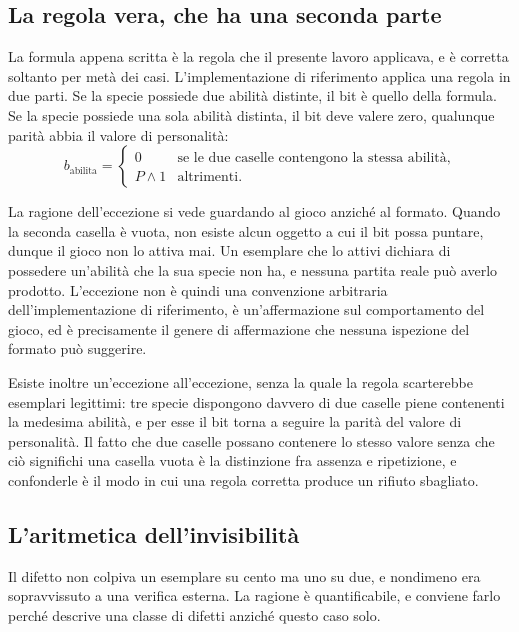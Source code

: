\subsection*{La regola vera, che ha una seconda parte}

La formula appena scritta è la regola che il presente lavoro applicava, e è corretta soltanto per metà dei casi. L'implementazione di riferimento applica una regola in due parti. Se la specie possiede due abilità distinte, il bit è quello della formula. Se la specie possiede una sola abilità distinta, il bit deve valere zero, qualunque parità abbia il valore di personalità:
\begin{equation}
b_{\mathrm{abilita}} =
\begin{cases}
0 & \text{se le due caselle contengono la stessa abilità},\\
P \wedge 1 & \text{altrimenti}.
\end{cases}
\end{equation}

La ragione dell'eccezione si vede guardando al gioco anziché al formato. Quando la seconda casella è vuota, non esiste alcun oggetto a cui il bit possa puntare, dunque il gioco non lo attiva mai. Un esemplare che lo attivi dichiara di possedere un'abilità che la sua specie non ha, e nessuna partita reale può averlo prodotto. L'eccezione non è quindi una convenzione arbitraria dell'implementazione di riferimento, è un'affermazione sul comportamento del gioco, ed è precisamente il genere di affermazione che nessuna ispezione del formato può suggerire.

Esiste inoltre un'eccezione all'eccezione, senza la quale la regola scarterebbe esemplari legittimi: tre specie dispongono davvero di due caselle piene contenenti la medesima abilità, e per esse il bit torna a seguire la parità del valore di personalità. Il fatto che due caselle possano contenere lo stesso valore senza che ciò significhi una casella vuota è la distinzione fra assenza e ripetizione, e confonderle è il modo in cui una regola corretta produce un rifiuto sbagliato.

\subsection*{L'aritmetica dell'invisibilità}

Il difetto non colpiva un esemplare su cento ma uno su due, e nondimeno era sopravvissuto a una verifica esterna. La ragione è quantificabile, e conviene farlo perché descrive una classe di difetti anziché questo caso solo.

